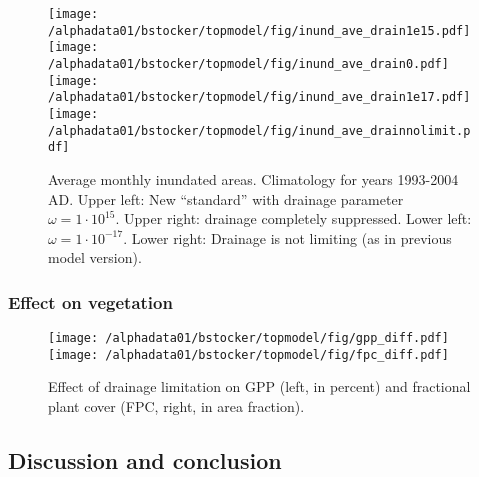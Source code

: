 \begin{figure}[ht!]
\begin{center}
  \texttt{[image: /alphadata01/bstocker/topmodel/fig/inund\_ave\_drain1e15.pdf]}
  \texttt{[image: /alphadata01/bstocker/topmodel/fig/inund\_ave\_drain0.pdf]}\\
  \texttt{[image: /alphadata01/bstocker/topmodel/fig/inund\_ave\_drain1e17.pdf]}
  \texttt{[image: /alphadata01/bstocker/topmodel/fig/inund\_ave\_drainnolimit.pdf]}
\end{center}
\caption{Average monthly inundated areas. Climatology for years 1993-2004 AD. Upper left: New ``standard'' with drainage parameter $\omega=1\cdot 10^{15}$. Upper right: drainage completely suppressed. Lower left: $\omega=1\cdot 10^{-17}$. Lower right: Drainage is not limiting (as in previous model version).}
\label{fig:inund}
\end{figure}
\clearpage

\subsubsection{Effect on vegetation}
\begin{figure}[ht!]
\begin{center}
  \texttt{[image: /alphadata01/bstocker/topmodel/fig/gpp\_diff.pdf]}
  \texttt{[image: /alphadata01/bstocker/topmodel/fig/fpc\_diff.pdf]}
\end{center}
\caption{Effect of drainage limitation on GPP (left, in percent) and fractional plant cover (FPC, right, in area fraction).}
\label{fig:vegdiff}
\end{figure}

\subsection{Discussion and conclusion}
\label{sec:gleeson}

